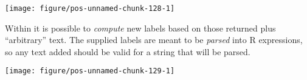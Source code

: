 \documentclass[paper=a4,10pt,div=17,headsepline,BCOR=12mm,twoside,open=right]{scrbook}\usepackage{knitr}
\begin{document}
\begin{knitrout}\footnotesize
{}\color{fgcolor}\begin{kframe}
\begin{alltt}
 \hlkwb{<-}  \hlopt{~}  \hlstd{,}  \hlstd{=} \hlstd{)}
  \hlopt{+}
  \hlstd{()} \hlopt{+}
  \hlstd{(} \hlstd{=} \hlstd{,}   \hlopt{+}
  \hlstd{(}\hlstd{(} 
                  \hlstd{=} \hlstd{)}
\end{alltt}
\end{kframe}

{\centering \texttt{[image: figure/pos-unnamed-chunk-128-1]} 

}



\end{knitrout}

Within  it is possible to \textit{compute} new labels based on those returned plus ``arbitrary'' text. The supplied labels are meant to be \textit{parsed} into R expressions, so any text added should be valid for a string that will be parsed.

\begin{knitrout}\footnotesize
{}\color{fgcolor}\begin{kframe}
\begin{alltt}
 \hlkwb{<-}  \hlopt{~}  \hlstd{,}  \hlstd{=} \hlstd{)}
  \hlopt{+}
  \hlstd{()} \hlopt{+}
  \hlstd{(} \hlstd{=} \hlstd{,}   \hlopt{+}
  \hlstd{(}\hlstd{(} \hlstd{=} 
                                  \hlstd{=} \hlstd{)),}
                  \hlstd{=} \hlstd{)}
\end{alltt}
\end{kframe}

{\centering \texttt{[image: figure/pos-unnamed-chunk-129-1]} 

}



\end{knitrout}
\end{document}
